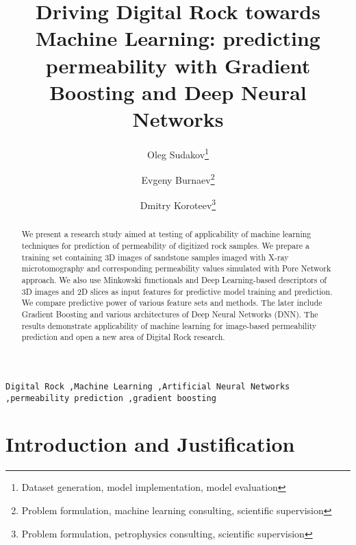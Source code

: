 \documentclass[review]{elsarticle}
\begin{document}
\begin{frontmatter}

\title{Driving Digital Rock towards Machine Learning: predicting permeability with Gradient Boosting and Deep Neural Networks}

\author[addressa]{Oleg Sudakov\footnote{Dataset generation, model implementation, model evaluation}}
\author[addressb]{Evgeny Burnaev\footnote{Problem formulation, machine learning consulting, scientific supervision}}
\author[addressc]{Dmitry Koroteev\footnote{Problem formulation, petrophysics consulting, scientific supervision}}

\address[addressa]{Skolkovo Institute of Science and Technology, Skolkovo Innovation Center, Building 3, Moscow, 143026, Russia, oleg.sudakov@skolkovotech.ru}
\address[addressb]{Skolkovo Institute of Science and Technology, Skolkovo Innovation Center, Building 3, Moscow, 143026, Russia, e.burnaev@skoltech.ru}
\address[addressc]{Skolkovo Institute of Science and Technology, Skolkovo Innovation Center, Building 3, Moscow, 143026, Russia, d.koroteev@skoltech.ru}

\begin{abstract}
We present a research study aimed at testing of applicability of machine learning techniques for prediction of permeability of digitized rock samples. We prepare a training set containing 3D images of sandstone samples imaged with X-ray microtomography and corresponding permeability values simulated with Pore Network approach. We also use Minkowski functionals and Deep Learning-based descriptors of 3D images and 2D slices as input features for predictive model training and prediction. We compare predictive power of various feature sets and methods. The later include
Gradient Boosting and various architectures of Deep Neural Networks (DNN). The results demonstrate applicability of machine learning for image-based permeability prediction and open a new area of Digital Rock research.

\end{abstract}

\begin{keyword}
\texttt{Digital Rock \sep Machine Learning \sep Artificial Neural Networks \sep permeability prediction \sep gradient boosting}
\end{keyword}

\end{frontmatter}

\section{Introduction and Justification}
\end{document}
